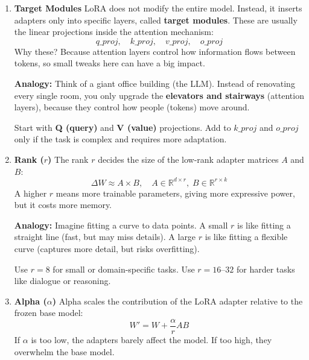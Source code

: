 \documentclass[a4paper, 12pt]{article}
\begin{document}
\begin{enumerate}
    \item \textbf{Target Modules}  
    LoRA does not modify the entire model. Instead, it inserts adapters only into specific layers, called \textbf{target modules}.  
    These are usually the linear projections inside the attention mechanism:
    \[
    q\_proj, \quad k\_proj, \quad v\_proj, \quad o\_proj
    \]
    Why these? Because attention layers control how information flows between tokens, so small tweaks here can have a big impact.  

    \textbf{Analogy:}  
Think of a giant office building (the LLM). Instead of renovating every single room, you only upgrade the \textbf{elevators and stairways} (attention layers), because they control how people (tokens) move around.  


    \begin{tcolorbox}[colback=blue!5,colframe=blue!70!black,title=Rule of Thumb]
        Start with \textbf{Q (query)} and \textbf{V (value)} projections.  
        Add to $k\_proj$ and $o\_proj$ only if the task is complex and requires more adaptation.
    \end{tcolorbox}

    \item \textbf{Rank ($r$)}  
    The rank $r$ decides the size of the low-rank adapter matrices $A$ and $B$:
    \[
    \Delta W \approx A \times B, \quad A \in \mathbb{R}^{d \times r}, \; B \in \mathbb{R}^{r \times k}
    \]
    A higher $r$ means more trainable parameters, giving more expressive power, but it costs more memory.  

    \textbf{Analogy:} Imagine fitting a curve to data points. A small $r$ is like fitting a straight line (fast, but may miss details). A large $r$ is like fitting a flexible curve (captures more detail, but risks overfitting).   

    \begin{tcolorbox}[colback=green!5,colframe=green!60!black,title=Rule of Thumb]
        Use $r=8$ for small or domain-specific tasks.  
        Use $r=16$–$32$ for harder tasks like dialogue or reasoning.
    \end{tcolorbox}

    \item \textbf{Alpha ($\alpha$)}  
    Alpha scales the contribution of the LoRA adapter relative to the frozen base model:
    \[
    W' = W + \frac{\alpha}{r} A B
    \]
    If $\alpha$ is too low, the adapters barely affect the model. If too high, they overwhelm the base model.  


\end{enumerate}
\end{document}
